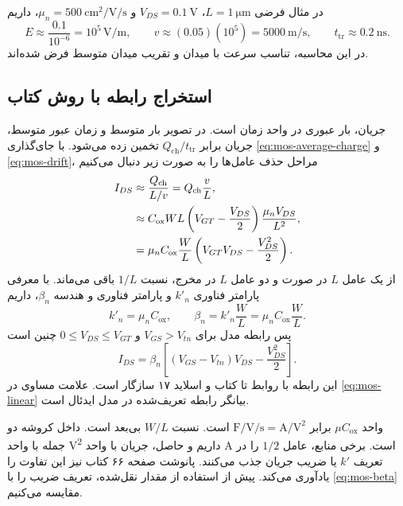 در مثال فرضی \(L=\qty{1}{\micro\metre}\)، \(V_{DS}=\qty{0.1}{\volt}\)
و \(\mu_n=\qty{500}{\centi\metre\squared\per\volt\per\second}\)، داریم
\[
 E\approx\frac{0.1}{10^{-6}}=10^5\,\unit{\volt\per\metre},\qquad
 v\approx(0.05)(10^5)=\qty{5000}{\metre\per\second},\qquad
 t_{\mathrm{tr}}\approx\qty{0.2}{\nano\second}.
\]
در این محاسبه، تناسب سرعت با میدان و تقریب میدان متوسط فرض شده‌اند.

\subsection{استخراج رابطه  با روش کتاب}
جریان، بار عبوری در واحد زمان است. در تصویر بار متوسط و زمان عبور متوسط،
جریان برابر \(Q_{\mathrm{ch}}/t_{\mathrm{tr}}\) تخمین زده می‌شود.
با جای‌گذاری \eqref{eq:mos-average-charge} و \eqref{eq:mos-drift}، مراحل حذف
عامل‌ها را به صورت زیر دنبال می‌کنیم
\begin{align}
 I_{DS}&\approx\frac{Q_{\mathrm{ch}}}{L/v}
 =Q_{\mathrm{ch}}\frac vL,\notag\\
 &\approx C_{\mathrm{ox}}WL\left(V_{GT}-\frac{V_{DS}}2\right)
 \frac{\mu_n V_{DS}}{L^2},\notag\\
 &=\mu_n C_{\mathrm{ox}}\frac WL
 \left(V_{GT}V_{DS}-\frac{V_{DS}^2}{2}\right).
 \label{eq:mos-book-linear}
\end{align}
از یک عامل \(L\) در صورت و دو عامل \(L\) در مخرج، نسبت \(1/L\) باقی می‌ماند.
با معرفی پارامتر فناوری \(k'_n\) و پارامتر فناوری و هندسه \(\beta_n\)، داریم
\begin{equation}
 k'_n=\mu_n C_{\mathrm{ox}},\qquad
 \beta_n=k'_n\frac WL=\mu_n C_{\mathrm{ox}}\frac WL.
 \label{eq:mos-beta}
\end{equation}
پس رابطه مدل برای \(V_{GS}>V_{tn}\) و \(0\le V_{DS}\le V_{GT}\) چنین است
\begin{equation}
 \boxed{I_{DS}=\beta_n\left[(V_{GS}-V_{tn})V_{DS}-\frac{V_{DS}^2}{2}\right].}
 \label{eq:mos-linear}
\end{equation}
این رابطه با روابط  تا  کتاب و اسلاید ۱۷ سازگار است.
علامت مساوی در \eqref{eq:mos-linear} بیانگر رابطه تعریف‌شده در مدل ایدئال است.

واحد \(\mu C_{\mathrm{ox}}\) برابر
\(\unit{\farad\per\volt\per\second}=\unit{\ampere\per\volt\squared}\) است.
نسبت \(W/L\) بی‌بعد است. داخل کروشه دو جمله با واحد \unit{\volt\squared}
داریم و حاصل، جریان با واحد \unit{\ampere} است.
برخی منابع، عامل \(1/2\) را در تعریف \(k'\) یا ضریب جریان جذب می‌کنند.
پانوشت صفحه ۶۶ کتاب نیز این تفاوت را یادآوری می‌کند.
پیش از استفاده از مقدار نقل‌شده، تعریف ضریب را با \eqref{eq:mos-beta} مقایسه می‌کنیم.


